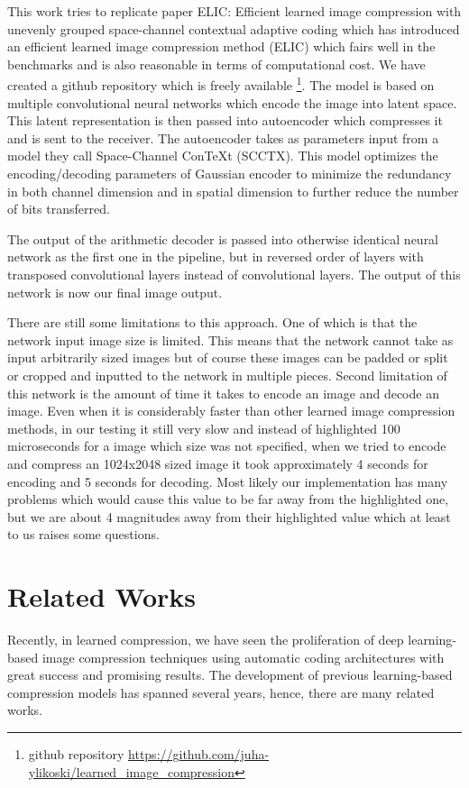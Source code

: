 \documentclass{article}
\begin{document}
This work tries to replicate paper ELIC: Efficient learned image compression with unevenly grouped space-channel contextual adaptive coding \cite{ELIC} which has introduced an efficient learned image compression method (ELIC) which fairs well in the benchmarks and is also reasonable in terms of computational cost.
We have created a github repository which is freely available \footnote{github repository \url{https://github.com/juha-ylikoski/learned_image_compression}}.
The model is based on multiple convolutional neural networks which encode the image into latent space.
This latent representation is then passed into autoencoder which compresses it and is sent to the receiver. 
The autoencoder takes as parameters input from a model they call Space-Channel ConTeXt (SCCTX).
This model optimizes the encoding/decoding parameters of Gaussian encoder to minimize the redundancy in both channel dimension and in spatial dimension to further reduce the number of bits transferred.

The output of the arithmetic decoder is passed into otherwise identical neural network as the first one in the pipeline, but in reversed order of layers with transposed convolutional layers instead of convolutional layers.
The output of this network is now our final image output. 

There are still some limitations to this approach. 
One of which is that the network input image size is limited.
This means that the network cannot take as input arbitrarily sized images but of course these images can be padded or split or cropped and inputted to the network in multiple pieces.
Second limitation of this network is the amount of time it takes to encode an image and decode an image. 
Even when it is considerably faster than other learned image compression methods, in our testing it still very slow and instead of highlighted 100 microseconds for a image which size was not specified, when we tried to encode and compress an 1024x2048 sized image it took approximately 4 seconds for encoding and 5 seconds for decoding.
Most likely our implementation has many problems which would cause this value to be far away from the highlighted one, but we are about 4 magnitudes away from their highlighted value which at least to us raises some questions.


\section{Related Works}
\label{sec:related_works}
Recently, in learned compression, we have seen the proliferation of deep learning-based image compression techniques using automatic coding architectures with great success and promising results. The development of previous learning-based compression models has spanned several years, hence, there are many related works. 
\end{document}
